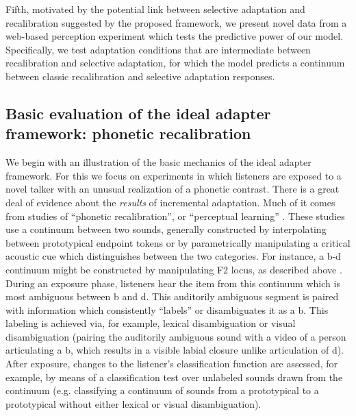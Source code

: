 Fifth, motivated by the potential link between selective adaptation and recalibration suggested by the proposed framework, we present novel data from a web-based perception experiment which tests the predictive power of our model. Specifically, we test adaptation conditions that are intermediate between recalibration and selective adaptation, for which the model predicts a continuum between classic recalibration and selective adaptation responses. %



\subsection{Basic evaluation of the ideal adapter framework: phonetic recalibration}
\label{sec:model-recal}

We begin with an illustration of the basic mechanics of the ideal adapter framework. For this we focus on experiments in which listeners are exposed to a novel talker with an unusual realization of a phonetic contrast. There is a great deal of evidence about the \emph{results} of incremental adaptation. Much of it comes from studies of ``phonetic recalibration'', or ``perceptual learning'' \autocite{Bertelson2003,Kraljic2005,Norris2003}.  These studies use a continuum between two sounds, generally constructed by interpolating between prototypical endpoint tokens \autocite[e.g.][]{Kraljic2005,Norris2003} or by parametrically manipulating a critical acoustic cue which distinguishes between the two categories.  For instance, a \ph b-\ph d continuum might be constructed by manipulating F2 locus, as described above \autocite{Bertelson2003,Vroomen2004}.  During an exposure phase, listeners hear the item from this continuum which is most ambiguous between \ph b and \ph d.  This auditorily ambiguous segment is paired with information which consistently ``labels'' or disambiguates it as a \ph b.  This labeling is achieved via, for example, lexical disambiguation \autocite[e.g. replacing the \ph b in \emph{club} with the ambiguous segment,][etc.]{Kraljic2005,Norris2003} or visual disambiguation (pairing the auditorily ambiguous sound with a video of a person articulating a \ph b, which results in a visible labial closure unlike articulation of \ph d).  After exposure, changes to the listener's classification function are assessed, for example, by means of a classification test over unlabeled sounds drawn from the continuum (e.g. classifying a continuum of sounds from a prototypical  to a prototypical  without either lexical or visual disambiguation).

